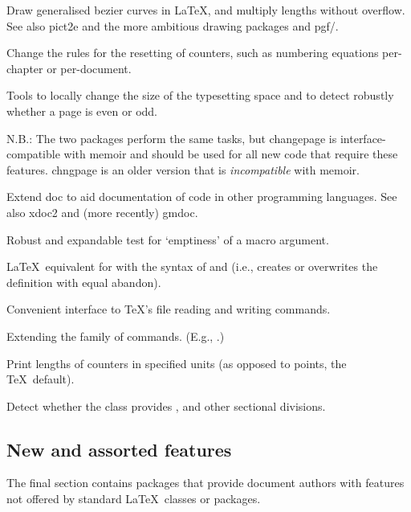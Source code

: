 \documentclass[final]{ltugboat}
\begin{document}
\begin{description}[font=\normalfont\sffamily]
\item [bez123 \& multiply] Draw generalised bezier curves in \LaTeX, and multiply lengths without overflow. See also \textsf{pict2e} and the more ambitious drawing packages \textsf{\PSTricks} and \textsf{pgf/\TikZ}.

\item [chngcntr] Change the rules for the resetting of counters, such as numbering equations per-chapter or per-document.
\item [chngpage \& changepage] Tools to locally change the size of the typesetting space and to detect robustly whether a page is even or odd.

N.B.: The two packages perform the same tasks, but \textsf{changepage} is interface-compatible with \textsf{memoir} and should be used for all new code that require these features. \textsf{chngpage} is an older version that is \emph{incompatible} with \textsf{memoir}.

\item [docmfp] Extend \textsf{doc} to aid documentation of code in other programming languages. See also \textsf{xdoc2} and (more recently) \textsf{gmdoc}.

\item [ifmtarg] Robust and expandable test for `emptiness' of a macro argument.
\item [makecmds] \LaTeX\ equivalent for  with the syntax of  and  (i.e., creates or overwrites the definition with equal abandon).
\item [newfile]  Convenient interface to \TeX's file reading and writing commands.
\item [nextpage] Extending the family of  commands. (E.g., .)
\item [printlen] Print lengths of counters in specified units (as opposed to points, the \TeX\ default).
\item [stdclsdv] Detect whether the class provides , and other sectional divisions.
\end{description}

\subsection{New and assorted features}

The final section contains packages that provide document authors with features not offered by standard \LaTeX\ classes or packages.
\end{document}
